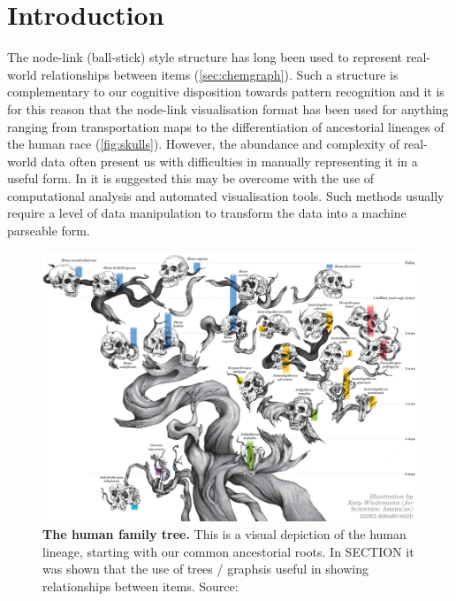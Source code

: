 

\section{Introduction}
The node-link (ball-stick) style structure has long been used to represent real-world relationships between items (\autoref{sec:chemgraph}). Such a structure is complementary to our cognitive disposition towards pattern recognition and it is for this reason that the node-link visualisation format has been used for anything ranging from transportation maps \citep{beck} to the differentiation of ancestorial lineages of the human race (\autoref{fig:skulls}). However, the abundance and complexity of real-world data often present us with difficulties in manually representing it in a useful form. In \label{syntatic} it is suggested this may be overcome with the use of computational analysis and automated visualisation tools. Such methods usually require a level of data manipulation to transform the data into a machine parseable form. 

\begin{figure}[H]
     \centering
         \includegraphics[width=\textwidth]{figures_c3/humanskulls.png}

        \caption[Caption for LOF]{\textbf{The human family tree.} This is a visual depiction of the human lineage, starting with our common ancestorial roots. In SECTION it was shown that the use of trees / graphs\protect\footnotemark is useful in showing relationships between items. Source: \citep{skull}}
        \label{fig:skulls}
\end{figure}



